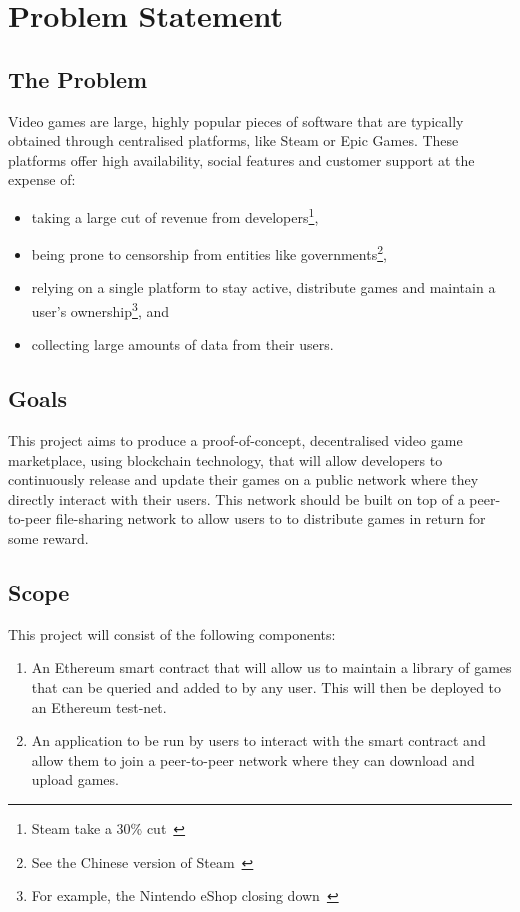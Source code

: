 
\chapter{Problem Statement}

\section{The Problem}\label{sec:problem}

Video games are large, highly popular pieces of software that are typically obtained through centralised platforms, like Steam or Epic Games. These platforms offer high availability, social features and customer support at the expense of:

\begin{itemize}
  \item taking a large cut of revenue from developers\footnote{Steam take a 30\% cut~\cite{marks_report_2019,brown_valve_2021}},
  \item being prone to censorship from entities like governments\footnote{See the Chinese version of Steam~\cite{noauthor_steam_nodate-1}},
  \item relying on a single platform to stay active, distribute games and maintain a user's ownership\footnote{For example, the Nintendo eShop closing down~\cite{noauthor_nintendo_2022}}, and
  \item collecting large amounts of data from their users.
\end{itemize}

\section{Goals}

This project aims to produce a proof-of-concept, decentralised video game marketplace, using blockchain technology, that will allow developers to continuously release and update their games on a public network where they directly interact with their users. This network should be built on top of a peer-to-peer file-sharing network to allow users to to distribute games in return for some reward.

\section{Scope}

This project will consist of the following components:

\begin{enumerate}
  \item An Ethereum smart contract that will allow us to maintain a library of games that can be queried and added to by any user. This will then be deployed to an Ethereum test-net.
  \item An application to be run by users to interact with the smart contract and allow them to join a peer-to-peer network where they can download and upload games.
\end{enumerate}